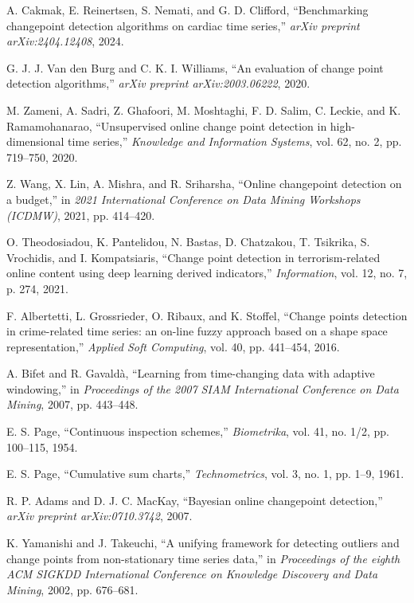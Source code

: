 \documentclass[journal,article,submit,pdftex,moreauthors]{Definitions/mdpi}
\begin{document}
A. Cakmak, E. Reinertsen, S. Nemati, and G. D. Clifford, ``Benchmarking changepoint detection algorithms on cardiac time series,'' \emph{arXiv preprint arXiv:2404.12408}, 2024.

G. J. J. Van den Burg and C. K. I. Williams, ``An evaluation of change point detection algorithms,'' \emph{arXiv preprint arXiv:2003.06222}, 2020.

M. Zameni, A. Sadri, Z. Ghafoori, M. Moshtaghi, F. D. Salim, C. Leckie, and K. Ramamohanarao, ``Unsupervised online change point detection in high-dimensional time series,'' \emph{Knowledge and Information Systems}, vol. 62, no. 2, pp. 719--750, 2020.

Z. Wang, X. Lin, A. Mishra, and R. Sriharsha, ``Online changepoint detection on a budget,'' in \emph{2021 International Conference on Data Mining Workshops (ICDMW)}, 2021, pp. 414--420.

O. Theodosiadou, K. Pantelidou, N. Bastas, D. Chatzakou, T. Tsikrika, S. Vrochidis, and I. Kompatsiaris, ``Change point detection in terrorism-related online content using deep learning derived indicators,'' \emph{Information}, vol. 12, no. 7, p. 274, 2021.

F. Albertetti, L. Grossrieder, O. Ribaux, and K. Stoffel, ``Change points detection in crime-related time series: an on-line fuzzy approach based on a shape space representation,'' \emph{Applied Soft Computing}, vol. 40, pp. 441--454, 2016.

A. Bifet and R. Gavaldà, ``Learning from time-changing data with adaptive windowing,'' in \emph{Proceedings of the 2007 SIAM International Conference on Data Mining}, 2007, pp. 443--448.

E. S. Page, ``Continuous inspection schemes,'' \emph{Biometrika}, vol. 41, no. 1/2, pp. 100--115, 1954.

E. S. Page, ``Cumulative sum charts,'' \emph{Technometrics}, vol. 3, no. 1, pp. 1--9, 1961.

R. P. Adams and D. J. C. MacKay, ``Bayesian online changepoint detection,'' \emph{arXiv preprint arXiv:0710.3742}, 2007.

K. Yamanishi and J. Takeuchi, ``A unifying framework for detecting outliers and change points from non-stationary time series data,'' in \emph{Proceedings of the eighth ACM SIGKDD International Conference on Knowledge Discovery and Data Mining}, 2002, pp. 676--681.
\end{document}
